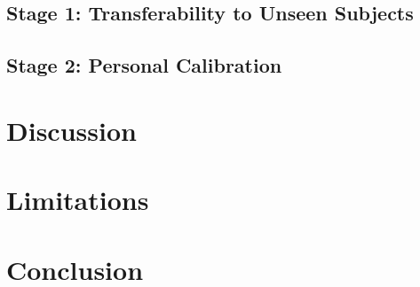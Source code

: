 \documentclass[11pt,a4paper]{article}
\begin{document}
\subsection{Stage 1: Transferability to Unseen Subjects}

\subsection{Stage 2: Personal Calibration}

\section{Discussion}

\section{Limitations}

\section{Conclusion}



\end{document}
